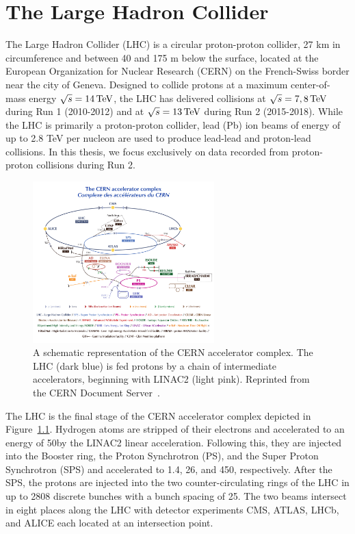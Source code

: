 \chapter{The Large Hadron Collider}

The Large Hadron Collider (LHC) is a circular proton-proton collider, 27 km in circumference and between 40 and 175 m below the surface, located at the European Organization for Nuclear Research (CERN) on the French-Swiss border near the city of Geneva.
Designed to collide protons at a maximum center-of-mass energy $\sqrt{s} = 14\,\text{Te\hspace{-.08em}V}$, the LHC has delivered collisions at $\sqrt{s} = 7, 8 \,\text{Te\hspace{-.08em}V}$ during Run 1 (2010-2012) and at $\sqrt{s} = 13\,\text{Te\hspace{-.08em}V}$ during Run 2 (2015-2018).
While the LHC is primarily a proton-proton collider, lead (Pb) ion beams of energy of up to 2.8 TeV per nucleon are used to produce lead-lead and proton-lead collisions.
In this thesis, we focus exclusively on data recorded from proton-proton collisions during Run 2.

\begin{figure}[htbp]
  \centering
  \includegraphics[width=0.625\textwidth]{Collider/Figures/LHC_diagram.pdf}
  \caption{
    A schematic representation of the CERN accelerator complex. 
    The LHC (dark blue) is fed protons by a chain of intermediate accelerators, beginning with LINAC2 (light pink).
    Reprinted from the CERN Document Server~\cite{}. %
  }
  \label{fig:lhc}
\end{figure}

The LHC is the final stage of the CERN accelerator complex depicted in Figure~\ref{fig:lhc}.
Hydrogen atoms are stripped of their electrons and accelerated to an energy of 50\GeV by the LINAC2 linear acceleration.
Following this, they are injected into the Booster ring, the Proton Synchrotron (PS), and the Super Proton Synchrotron (SPS) and accelerated to 1.4, 26, and 450\GeV, respectively.
After the SPS, the protons are injected into the two counter-circulating rings of the LHC in up to 2808 discrete bunches with a bunch spacing of 25\ns.
The two beams intersect in eight places along the LHC with detector experiments CMS, ATLAS, LHCb, and ALICE each located at an intersection point.

